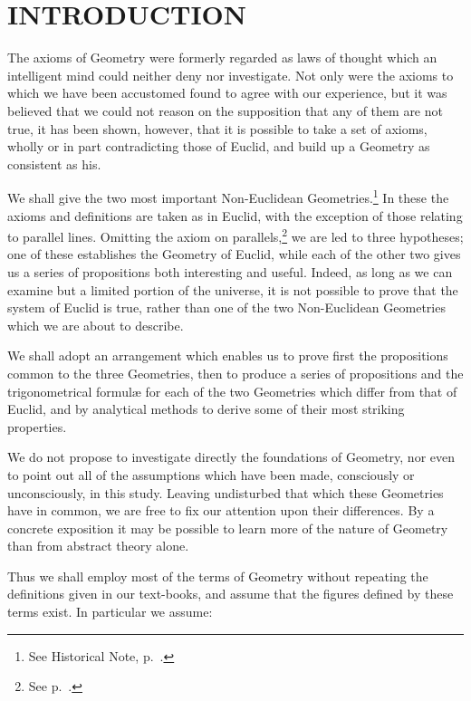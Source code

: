 \chapter{INTRODUCTION}

The axioms of Geometry were formerly regarded as laws of thought
which an intelligent mind could neither deny nor investigate. Not
only were the axioms to which we have been accustomed found to agree
with our experience, but it was believed that we could not reason on
the supposition that any of them are not true, it has been shown,
however, that it is possible to take a set of axioms, wholly or in
part contradicting those of Euclid, and build up a Geometry as
consistent as his.

We shall give the two most important Non-Euclidean
Geometries.\footnote{See Historical Note, p.~\pageref{histnote}.} In
these the axioms and definitions are taken as in Euclid, with the
exception of those relating to parallel lines. Omitting the axiom on
parallels,\footnote{See p.~\pageref{3hypos}.} we are led to three
hypotheses; one of these establishes the Geometry of Euclid, while
each of the other two gives us a series of propositions both
interesting and useful. Indeed, as long as we can examine but a
limited portion of the universe, it is not possible to prove that
the system of Euclid is true, rather than one of the two
Non-Euclidean Geometries which we are about to describe.

We shall adopt an arrangement which enables us to prove first the
propositions common to the three Geometries, then to produce a
series of propositions and the trigonometrical formulæ for each of
the two Geometries which differ from that of Euclid, and by
analytical methods to derive some of their most striking properties.

We do not propose to investigate directly the foundations of
Geometry, nor even to point out all of the assumptions which have
been made, consciously or unconsciously, in this study. Leaving
undisturbed that which these Geometries have in common, we are free
to fix our attention upon their differences. By a concrete
exposition it may be possible to learn more of the nature of
Geometry than from abstract theory alone.

\newpage
Thus we shall employ most of the terms of Geometry without
repeating the definitions given in our text-books, and assume that
the figures defined by these terms exist. In particular we assume:
\smallskip

